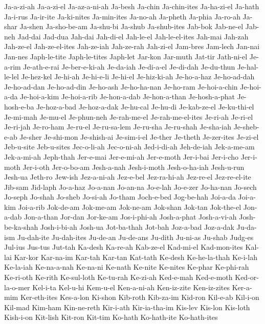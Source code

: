 {  Ja-a-zi-ah Ja-a-zi-el Ja-az-a-ni-ah Ja-besh Ja-chin Ja-chin-ites
  Ja-ha-zi-el Ja-hath Ja-i-rus Ja-ir-ite Ja-ki-nites Ja-min-ites
  Ja-no-ah Ja-pheth Ja-phia Ja-ro-ah Ja-shar Ja-shen
  Ja-sho-be-am Ja-shu-bi Ja-shub Ja-shub-ites Jab-bok Jab-ne-el
  Jab-neh Jad-dai Jad-dua Jah-dai Jah-di-el Jah-le-el
  Jah-le-el-ites Jah-mai Jah-zah Jah-ze-el Jah-ze-el-ites Jah-ze-iah
  Jah-ze-rah Jah-zi-el Jam-bres Jam-lech Jan-nai Jan-nes
  Japh-le-tite Japh-le-tites Japh-let Jar-kon Jar-muth Jat-tir
  Jath-ni-el Je-a-rim Je-ath-e-rai Je-ber-e-ki-ah Je-da-iah Je-di-a-el
  Je-di-dah Je-du-thun Je-hal-le-lel Je-hez-kel Je-hi-ah Je-hi-e-li
  Je-hi-el Je-hiz-ki-ah Je-ho-a-haz Je-ho-ad-dah Je-ho-ad-dan Je-ho-ad-din
  Je-ho-ash Je-ho-ha-nan Je-ho-ram Je-hoi-a-chin Je-hoi-a-da Je-hoi-a-kim
  Je-hoi-a-rib Je-hon-a-dab Je-hon-a-than Je-hosh-a-phat Je-hosh-e-ba Je-hoz-a-bad
  Je-hoz-a-dak Je-hu-cal Je-hu-di Je-kab-ze-el Je-ku-thi-el Je-mi-mah
  Je-mu-el Je-phun-neh Je-rah-me-el Je-rah-me-el-ites Je-ri-ah Je-ri-el
  Je-ri-jah Je-ro-ham Je-ru-el Je-ru-sa-lem Je-ru-sha Je-ru-shah
  Je-sha-iah Je-sheb-e-ab Je-sher Je-shi-mon Je-shish-ai Je-sim-i-el
  Je-ther Je-theth Je-zer-ites Je-zi-el Jeb-u-site Jeb-u-sites
  Jec-o-li-ah Jec-o-ni-ah Jed-i-di-ah Jeh-de-iah Jek-a-me-am Jek-a-mi-ah
  Jeph-thah Jer-e-mai Jer-e-mi-ah Jer-e-moth Jer-i-bai Jer-i-cho
  Jer-i-moth Jer-i-oth Jer-o-bo-am Jesh-a-nah Jesh-i-moth Jesh-o-ha-iah
  Jesh-u-run Jesh-ua Jeth-ro Jew-ish Jez-a-ni-ah Jez-e-bel
  Jez-ra-hi-ah Jez-re-el Jez-re-el-ite Jib-sam Jid-laph Jo-a-haz
  Jo-a-nan Jo-an-na Jo-e-lah Jo-e-zer Jo-ha-nan Jo-sech
  Jo-seph Jo-shah Jo-sheb Jo-si-ah Jo-tham Joch-e-bed
  Jog-be-hah Joi-a-da Joi-a-kim Joi-a-rib Jok-de-am Jok-me-am
  Jok-ne-am Jok-shan Jok-tan Jok-the-el Jon-a-dab Jon-a-than
  Jor-dan Jor-ke-am Jos-i-phi-ah Josh-a-phat Josh-a-vi-ah Josh-be-ka-shah
  Josh-i-bi-ah Josh-ua Jot-ba-thah Jot-bah Joz-a-bad Joz-a-dak
  Ju-da-ism Ju-dah-ite Ju-dah-ites Ju-de-an Ju-de-ans Ju-dith
  Ju-ni-as Ju-shab Judg-es Jul-ius Jus-tus Jut-tah
  Ka-desh Ka-re-ah Kab-ze-el Kad-mi-el Kad-mon-ites Kal-lai
  Kar-kor Kar-na-im Kar-tah Kar-tan Kat-tath Ke-desh
  Ke-he-la-thah Ke-i-lah Ke-la-iah Ke-na-a-nah Ke-na-ni Ke-nath
  Ke-nite Ke-nites Ke-phar Ke-phi-rah Ke-ri-oth Ke-rith
  Ke-sul-loth Ke-tu-rah Ke-zi-ah Ked-e-mah Ked-e-moth Ked-or-la-o-mer
  Kel-i-ta Kel-u-hi Kem-u-el Ken-a-ni-ah Ken-iz-zite Ken-iz-zites
  Ker-a-mim Ker-eth-ites Kes-a-lon Ki-shon Kib-roth Kib-za-im
  Kid-ron Kil-e-ab Kil-i-on Kil-mad Kim-ham Kin-ne-reth
  Kir-i-ath Kir-ia-tha-im Kis-lev Kis-lon Kis-loth Kish-i-on
  Kit-lish Kit-ron Kit-tim Ko-hath Ko-hath-ite Ko-hath-ites
}
